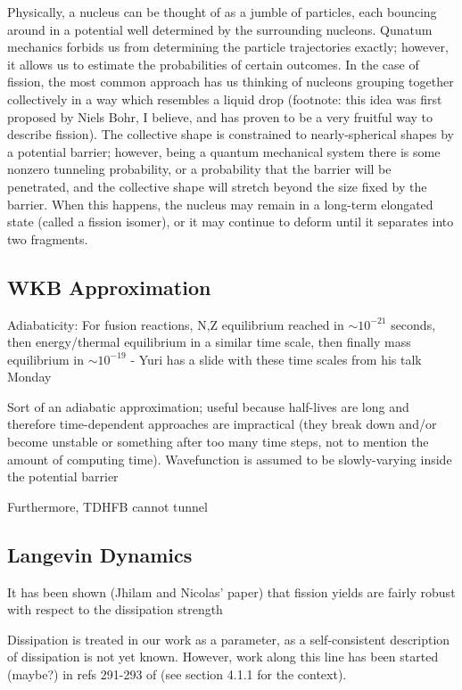 Physically, a nucleus can be thought of as a jumble of particles, each bouncing around in a potential well determined by the surrounding nucleons. Qunatum mechanics forbids us from determining the particle trajectories exactly; however, it allows us to estimate the probabilities of certain outcomes. In the case of fission, the most common approach has us thinking of nucleons grouping together collectively in a way which resembles a liquid drop (footnote: this idea was first proposed by Niels Bohr, I believe, and has proven to be a very fruitful way to describe fission). The collective shape is constrained to nearly-spherical shapes by a potential barrier; however, being a quantum mechanical system there is some nonzero tunneling probability, or a probability that the barrier will be penetrated, and the collective shape will stretch beyond the size fixed by the barrier. When this happens, the nucleus may remain in a long-term elongated state (called a fission isomer), or it may continue to deform until it separates into two fragments.

\subsection{WKB Approximation}

Adiabaticity: For fusion reactions, N,Z equilibrium reached in $\sim10^{-21}$ seconds, then energy/thermal equilibrium in a similar time scale, then finally mass equilibrium in $\sim10^{-19}$ - Yuri has a slide with these time scales from his talk Monday

Sort of an adiabatic approximation; useful because half-lives are long and therefore time-dependent approaches are impractical (they break down and/or become unstable or something after too many time steps, not to mention the amount of computing time). Wavefunction is assumed to be slowly-varying inside the potential barrier

Furthermore, TDHFB cannot tunnel

\subsection{Langevin Dynamics}

It has been shown (Jhilam and Nicolas' paper) that fission yields are fairly robust with respect to the dissipation strength

Dissipation is treated in our work as a parameter, as a self-consistent description of dissipation is not yet known. However, work along this line has been started (maybe?) in refs 291-293 of \cite{Schmidt2018} (see section 4.1.1 for the context).